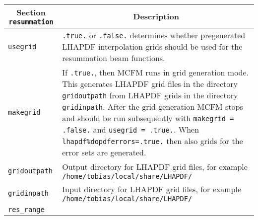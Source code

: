 \begin{longtable}{p{1.5cm}p{12cm}}
		\toprule
		\multicolumn{1}{c}{{\textbf{Section} \texttt{resummation}}} & \multicolumn{1}{c}{{\textbf{Description}}} \\ 
		\midrule
\begin{minipage}[t]{0.24\columnwidth}\raggedright
\texttt{usegrid}\strut
\end{minipage} & \begin{minipage}[t]{0.71\columnwidth}\raggedright
\texttt{.true.} or \texttt{.false.} determines whether pregenerated
LHAPDF interpolation grids should be used for the resummation beam
functions.\strut
\end{minipage}\tabularnewline
\begin{minipage}[t]{0.24\columnwidth}\raggedright
\texttt{makegrid}\strut
\end{minipage} & \begin{minipage}[t]{0.71\columnwidth}\raggedright
If \texttt{.true.}, then MCFM runs in grid generation mode. This
generates LHAPDF grid files in the directory \texttt{gridoutpath} from
LHAPDF grids in the directory \texttt{gridinpath}. After the grid
generation MCFM stops and should be run subsequently with
\texttt{makegrid = .false.} and \texttt{usegrid = .true.}. When
\texttt{lhapdf\%dopdferrors=.true.} then also grids for the error sets
are generated.\strut
\end{minipage}\tabularnewline
\begin{minipage}[t]{0.24\columnwidth}\raggedright
\texttt{gridoutpath}\strut
\end{minipage} & \begin{minipage}[t]{0.71\columnwidth}\raggedright
Output directory for LHAPDF grid files, for example
\texttt{/home/tobias/local/share/LHAPDF/}\strut
\end{minipage}\tabularnewline
\begin{minipage}[t]{0.24\columnwidth}\raggedright
\texttt{gridinpath}\strut
\end{minipage} & \begin{minipage}[t]{0.71\columnwidth}\raggedright
Input directory for LHAPDF grid files, for example
\texttt{/home/tobias/local/share/LHAPDF/}\strut
\end{minipage}\tabularnewline
\begin{minipage}[t]{0.24\columnwidth}\raggedright
\texttt{res\_range}\strut
\end{minipage} & \begin{minipage}[t]{0.71\columnwidth}\raggedright

\end{minipage}
\end{longtable}
